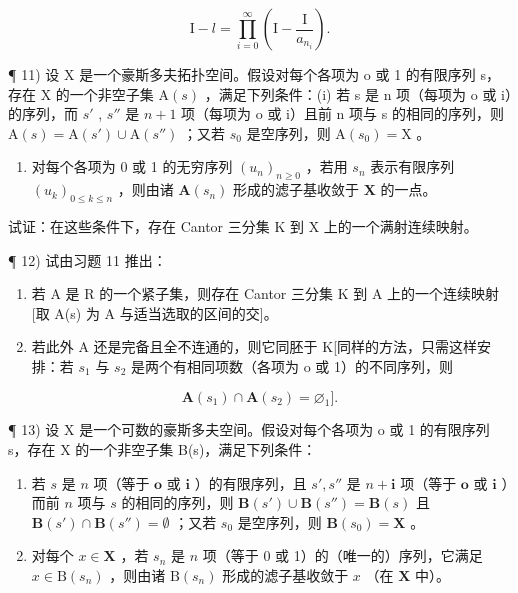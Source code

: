 \[
\mathrm{I} - l = \prod_ {i = 0} ^ {\infty} \left(\mathrm{I} - \frac {\mathrm{I}}{a _ {n _ {i}}}\right).
\]

¶ 11) 设 X 是一个豪斯多夫拓扑空间。假设对每个各项为 o 或 1 的有限序列 s，存在 X 的一个非空子集 \(\mathrm{A}(s)\) ，满足下列条件：(i) 若 s 是 n 项（每项为 o 或 i）的序列，而 \(s'\) , \(s''\) 是 \(n + 1\) 项（每项为 o 或 i）且前 n 项与 s 的相同的序列，则 \(\mathrm{A}(s) = \mathrm{A}(s') \cup \mathrm{A}(s'')\) ；又若 \(s_0\) 是空序列，则 \(\mathrm{A}(s_0) = \mathrm{X}\) 。

\begin{enumerate}
\def\labelenumi{(\roman{enumi})}
\setcounter{enumi}{1}
\tightlist
\item
对每个各项为 0 或 1 的无穷序列 \((u_n)_{n\geqslant 0}\) ，若用 \(s_n\) 表示有限序列 \((u_k)_{0\leqslant k\leqslant n}\) ，则由诸 \(\mathbf{A}(s_n)\) 形成的滤子基收敛于 \(\mathbf{X}\) 的一点。
\end{enumerate}

试证：在这些条件下，存在 Cantor 三分集 K 到 X 上的一个满射连续映射。

¶ 12) 试由习题 11 推出：

\begin{enumerate}
\def\labelenumi{\alph{enumi})}
\item
若 A 是 R 的一个紧子集，则存在 Cantor 三分集 K 到 A 上的一个连续映射{[}取 A(s) 为 A 与适当选取的区间的交{]}。
\item
若此外 A 还是完备且全不连通的，则它同胚于 K{[}同样的方法，只需这样安排：若 \(s_{1}\) 与 \(s_{2}\) 是两个有相同项数（各项为 o 或 1）的不同序列，则
\end{enumerate}

\[
\mathbf {A} (s _ {1}) \cap \mathbf {A} (s _ {2}) = \varnothing_ {1} ].
\]

¶ 13) 设 X 是一个可数的豪斯多夫空间。假设对每个各项为 o 或 1 的有限序列 s，存在 X 的一个非空子集 B(s)，满足下列条件：

\begin{enumerate}
\def\labelenumi{(\roman{enumi})}
\item
若 \(s\) 是 \(n\) 项（等于 \(\mathbf{o}\) 或 \(\mathbf{i}\) ）的有限序列，且 \(s', s''\) 是 \(n + \mathbf{i}\) 项（等于 \(\mathbf{o}\) 或 \(\mathbf{i}\) ）而前 \(n\) 项与 \(s\) 的相同的序列，则 \(\mathbf{B}(s') \cup \mathbf{B}(s'') = \mathbf{B}(s)\) 且 \(\mathbf{B}(s') \cap \mathbf{B}(s'') = \emptyset\) ；又若 \(s_0\) 是空序列，则 \(\mathbf{B}(s_0) = \mathbf{X}\) 。
\item
对每个 \(x \in \mathbf{X}\) ，若 \(s_n\) 是 \(n\) 项（等于 0 或 1）的（唯一的）序列，它满足 \(x \in \mathrm{B}(s_n)\) ，则由诸 \(\mathrm{B}(s_n)\) 形成的滤子基收敛于 \(x\) （在 \(\mathbf{X}\) 中）。
\end{enumerate}

